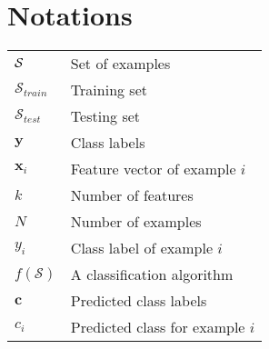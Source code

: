 
\chapter{Notations}
	
\begin{tabularx}{\textwidth}{ l X }
$\cal S$ 		& Set of examples 		\dotfill \pageref{ntn:ch2:1} \\ 
$\mathcal{S}_{train}$ 	& Training set	 		\dotfill \pageref{ntn:ch2:1} \\
$\mathcal{S}_{test}$ 	& Testing set	 		\dotfill \pageref{ntn:ch2:1} \\
$\mathbf{y}$ 		& Class labels 			\dotfill \pageref{ntn:ch2:1} \\  
$\mathbf{x}_i$ 		& Feature vector of example $i$ \dotfill \pageref{ntn:ch2:1} \\
$k$ 			& Number of features 		\dotfill \pageref{ntn:ch2:1} \\
$N $ 			& Number of examples 		\dotfill \pageref{ntn:ch2:1} \\
$y_i$ 			& Class label of example $i$ 	\dotfill \pageref{ntn:ch2:1} \\
$f(\mathcal{S})$ 	& A classification algorithm 	\dotfill \pageref{ntn:ch2:1} \\
$\mathbf{c}$ 		& Predicted class labels 	\dotfill \pageref{ntn:ch2:1} \\  
$c_i$ 			& Predicted class for example $i$  \dotfill \pageref{ntn:ch2:1} \\
\end{tabularx}
